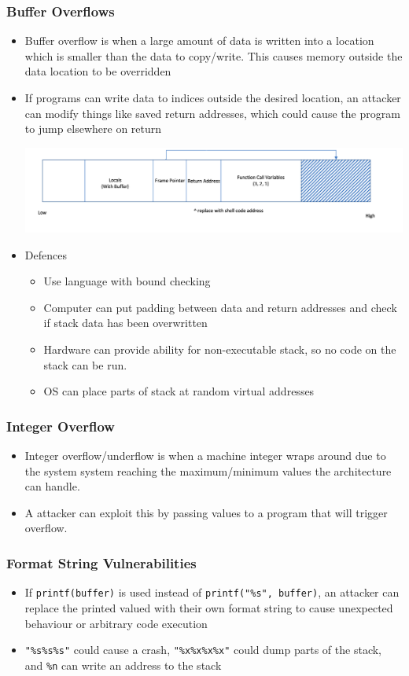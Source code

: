 \documentclass[twoside]{article}
\begin{document}
\subsubsection{Buffer Overflows}
\begin{itemize}
\item Buffer overflow is when a large amount of data is written into a location which  is smaller than the data to copy/write.  This causes memory outside the data location to be overridden
\item If programs can write data to indices outside the desired location, an attacker can modify things like saved return addresses, which could cause the program to jump elsewhere on return
\begin{center}
\includegraphics[scale=0.5]{1}
\end{center}
\item Defences
\begin{itemize}
\item Use language with bound checking
\item Computer can put padding between data and return addresses and check if stack data has been overwritten
\item Hardware can provide ability for non-executable stack, so no code  on the stack can be run.
\item OS can place parts of stack at random virtual addresses 
\end{itemize}
\end{itemize}

\subsubsection{Integer Overflow}
\begin{itemize}
\item Integer overflow/underflow is when a machine integer wraps around due to the system system reaching the maximum/minimum values the architecture can handle. 
\item A attacker can exploit this by passing values to a program that will trigger overflow. 
\end{itemize}

\subsubsection{Format String Vulnerabilities}
\begin{itemize}
\item If \verb|printf(buffer)| is used instead of \verb|printf("%s", buffer)|, an attacker can replace the printed valued with their own format string to cause unexpected behaviour or arbitrary code execution 
\item \verb|"%s%s%s"| could cause a crash, \verb|"%x%x%x%x"| could dump parts of the stack, and \verb|%n| can write an address to the stack
\end{itemize}
\end{document}
